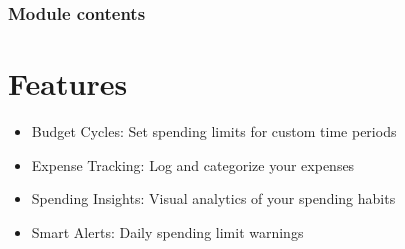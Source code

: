 \documentclass[letterpaper,10pt,english]{sphinxmanual}
\begin{document}
\subsection{Module contents}
\label{\detokenize{softwareProject:module-softwareProject}}\label{\detokenize{softwareProject:module-contents}}

\chapter{Features}
\label{\detokenize{index:features}}\begin{itemize}
\item {} 
\sphinxAtStartPar
Budget Cycles: Set spending limits for custom time periods

\item {} 
\sphinxAtStartPar
Expense Tracking: Log and categorize your expenses

\item {} 
\sphinxAtStartPar
Spending Insights: Visual analytics of your spending habits

\item {} 
\sphinxAtStartPar
Smart Alerts: Daily spending limit warnings

\end{itemize}
\end{document}
